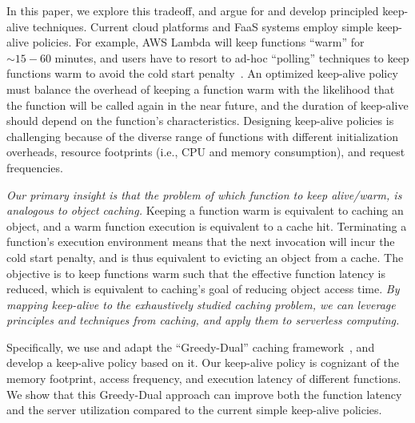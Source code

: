 In this paper, we explore this tradeoff, and argue for and develop principled keep-alive techniques. 
%
Current cloud platforms and FaaS systems employ simple keep-alive policies. 
%
For example, AWS Lambda will keep functions ``warm'' for $\sim 15-60$ minutes, and users have to resort to ad-hoc ``polling'' techniques to keep functions warm to avoid the cold start penalty~\cite{lambda-warm, lambda-limits, lambda-warm-hour}. 
% 
An optimized keep-alive policy must balance the overhead of keeping a function warm with the likelihood that the function will be called again in the near future, and the duration of keep-alive should depend on the function's characteristics. 
%
Designing keep-alive policies is challenging because of the diverse range of functions with different initialization overheads, resource footprints (i.e., CPU and memory consumption),  and request frequencies. 
%


%
\emph{Our primary insight is that the problem of which function to keep alive/warm, is analogous to object caching.} 
% 
Keeping a function warm is equivalent to caching an object, and a warm function execution is equivalent to a cache hit. 
%
Terminating a function's execution environment means that the next invocation will incur the cold start penalty, and is thus equivalent to evicting an object from a cache. 
% 
The objective is to keep functions warm such that the effective function latency is reduced, which is equivalent to caching's goal of reducing object access time. 
%
\emph{By mapping keep-alive to the exhaustively studied caching problem, we can leverage principles and techniques from caching, and apply them to serverless computing.}


%
Specifically, we use and adapt the ``Greedy-Dual'' caching framework~\cite{gdsf}, and develop a keep-alive policy based on it. 
%
Our keep-alive policy is cognizant of the memory footprint, access frequency, and execution latency of different functions. 
%
We show that this Greedy-Dual approach can improve both the function latency and the server utilization compared to the current simple keep-alive policies. 



%
%








